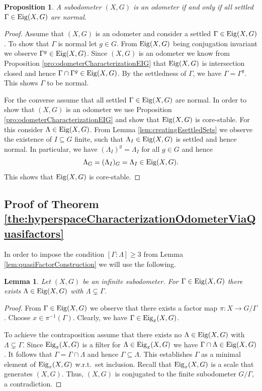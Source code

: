 \documentclass[12pt, reqno]{amsart}
\newtheorem{lemma}[theorem]{Lemma}
\newtheorem{proposition}[theorem]{Proposition}
\theoremstyle{definition}
\theoremstyle{remark}
\numberwithin{equation}{section}
\theoremstyle{theorem}
\theoremstyle{remark}
\def\Eig{{\rm Eig}}
\begin{document}
\begin{proposition}
\label{pro:filteredEigensetsViaEsettled}
   A subodometer $(X,G)$ is an odometer if and only if all settled $\Gamma\in \Eig(X,G)$ are normal. 
\end{proposition}
\begin{proof}
    Assume that $(X,G)$ is an odometer and consider a settled $\Gamma\in \Eig(X,G)$. 
    To show that $\Gamma$ is normal let $g\in G$. 
    From $\Eig(X,G)$ being conjugation invariant we observe $\Gamma^g\in \Eig(X,G)$. 
    Since $(X,G)$ is an odometer we know from Proposition \ref{pro:odometerCharacterizationEIG} that $\Eig(X,G)$ is intersection closed and hence $\Gamma\cap \Gamma^g\in \Eig(X,G)$. 
    By the settledness of $\Gamma$, we have $\Gamma=\Gamma^g$.
    This shows $\Gamma$ to be normal. 

    For the converse assume that all settled $\Gamma\in \Eig(X,G)$ are normal. In order to show that $(X,G)$ is an odometer we use Proposition \ref{pro:odometerCharacterizationEIG} and show that $\Eig(X,G)$ is core-stable. 
    For this consider $\Lambda\in \Eig(X,G)$. 
    From Lemma \ref{lem:creatingEsettledSets} we observe the existence of $I\subseteq G$ finite, such that $\Lambda_I\in \Eig(X,G)$ is settled and hence normal. In particular, we have $(\Lambda_I)^g=\Lambda_I$ for all $g\in G$ and hence
    \[\Lambda_G=(\Lambda_I)_G=\Lambda_I\in \Eig(X,G).\]
    This shows that $\Eig(X,G)$ is core-stable. 
\end{proof}



\subsection{Proof of Theorem \ref{the:hyperspaceCharacterizationOdometerViaQuasifactors}}
\label{subsec:hyperspacesOfSubodometers_ProofOfTheoremCOVQ}
In order to impose the condition $[\Gamma\colon \Lambda]\geq 3$ from Lemma \ref{lem:quasiFactorConstruction} we will use the following. 

\begin{lemma}
\label{lem:indicesInInfiniteEigensets}
   Let $(X,G)$ be an infinite subodometer. 
   For $\Gamma\in \Eig(X,G)$ there exists $\Lambda\in \Eig(X,G)$ with $\Lambda\subsetneq \Gamma$. 
\end{lemma}
\begin{proof}
    From $\Gamma\in \Eig(X,G)$ we observe that there exists a factor map $\pi\colon X\to G/\Gamma$. 
    Choose $x\in \pi^{-1}(\Gamma)$. 
    Clearly, we have $\Gamma\in \Eig_x(X,G)$. 

    To achieve the contraposition assume that there exists no $\Lambda\in \Eig(X,G)$ with $\Lambda\subsetneq \Gamma$. 
    Since $\Eig_x(X,G)$ is a filter for $\Lambda\in \Eig_x(X,G)$ 
    we have $\Gamma\cap\Lambda\in \Eig(X,G)$. 
    It follows that $\Gamma=\Gamma\cap \Lambda$ and hence $\Gamma\subseteq \Lambda$. 
    This establishes $\Gamma$ as a minimal element of $\Eig_x(X,G)$ w.r.t.\ set inclusion. 
    Recall that $\Eig_x(X,G)$ is a scale that generates $(X,G)$.
    Thus, $(X,G)$ is conjugated to the finite subodometer $G/\Gamma$, a contradiction. 
\end{proof}
\end{document}
